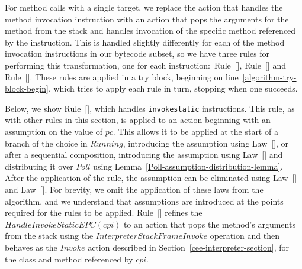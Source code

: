 For method calls with a single target, we replace the action that
handles the method invocation instruction with an action that pops the
arguments for the method from the stack and handles invocation of the
specific method referenced by the instruction.
This is handled slightly differently for each of the method invocation
instructions in our bytecode subset, so we have three rules for
performing this transformation, one for each
instruction:~Rule~[],
Rule~[] and
Rule~[].
These rules are applied in a try block, beginning on
line~\ref{algorithm-try-block-begin}, which tries to apply each rule in
turn, stopping when one succeeds.

Below, we show Rule~[], which
handles \texttt{invokestatic} instructions.
This rule, as with other rules in this section, is applied to an
action beginning with an assumption on the value of $pc$.
This allows it to be applied at the start of a branch of the choice in
$Running$, introducing the assumption using
Law~[], or after a sequential
composition, introducing the assumption using
Law~[] and distributing it over
$Poll$ using Lemma~\ref{Poll-assumption-distribution-lemma}.
After the application of the rule, the assumption can be eliminated
using Law~[] and
Law~[].
For brevity, we omit the application of these laws from the algorithm,
and we understand that assumptions are introduced at the points
required for the rules to be applied.
Rule~[] refines the
$HandleInvokeStaticEPC(cpi)$ to an action that pops the method's
arguments from the stack using the $InterpreterStackFrameInvoke$
operation and then behaves as the $Invoke$ action described in
Section~\ref{cee-interpreter-section}, for the class and method
referenced by $cpi$.
